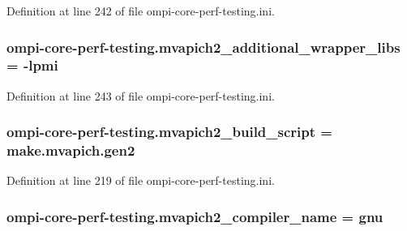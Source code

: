 Definition at line 242 of file ompi-\/core-\/perf-\/testing.\-ini.

\hypertarget{namespaceompi-core-perf-testing_a43fca8dff7f5401c4331cc8c4ce990e8}{
\subsubsection[{mvapich2\-\_\-additional\-\_\-wrapper\-\_\-libs}]{\setlength{\rightskip}{0pt plus 5cm}ompi-\/core-\/perf-\/testing.\-mvapich2\-\_\-additional\-\_\-wrapper\-\_\-libs = -\/lpmi}}\label{namespaceompi-core-perf-testing_a43fca8dff7f5401c4331cc8c4ce990e8}


Definition at line 243 of file ompi-\/core-\/perf-\/testing.\-ini.

\hypertarget{namespaceompi-core-perf-testing_abfff00b4161e96bde810f9663393d72b}{
\subsubsection[{mvapich2\-\_\-build\-\_\-script}]{\setlength{\rightskip}{0pt plus 5cm}ompi-\/core-\/perf-\/testing.\-mvapich2\-\_\-build\-\_\-script = make.\-mvapich.\-gen2}}\label{namespaceompi-core-perf-testing_abfff00b4161e96bde810f9663393d72b}


Definition at line 219 of file ompi-\/core-\/perf-\/testing.\-ini.

\hypertarget{namespaceompi-core-perf-testing_aeed3a0308c22144a5231f51e5f1f1e01}{
\subsubsection[{mvapich2\-\_\-compiler\-\_\-name}]{\setlength{\rightskip}{0pt plus 5cm}ompi-\/core-\/perf-\/testing.\-mvapich2\-\_\-compiler\-\_\-name = gnu}}\label{namespaceompi-core-perf-testing_aeed3a0308c22144a5231f51e5f1f1e01}


